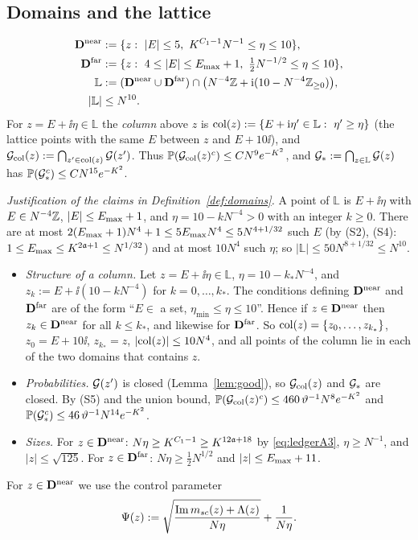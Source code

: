 \subsection{Domains and the lattice}
\begin{definition}\label{def:domains}
\begin{align*}
 \bD^{\rm near}&:=\{z:\ |E|\le5,\ K^{C_1-1}N^{-1}\le\eta\le10\},\\
 \bD^{\rm far}&:=\{z:\ 4\le|E|\le\Emax+1,\ \tfrac12N^{-1/2}\le\eta\le10\},\\
 \mathbb L&:=(\bD^{\rm near}\cup\bD^{\rm far})\cap\big(N^{-4}\Z+\ii(10-N^{-4}\Z_{\ge 0})\big),\\
 |\mathbb L|&\le N^{10}.
\end{align*}
For $z=E+\ii\eta\in\mathbb L$ the \emph{column} above $z$ is ${\rm col}(z):=\{E+\ii\eta'\in\mathbb L:\ \eta'\ge\eta\}$ (the lattice points with the same $E$ between $z$ and $E+10\ii$), and
$\mathcal{G}_{\rm col}(z):=\bigcap_{z'\in{\rm col}(z)}\mathcal{G}(z')$. Thus $\mathbb{P}(\mathcal{G}_{\rm col}(z)^c)\le CN^{9}e^{-K^2}$, and $\mathcal{G}_*:=\bigcap_{z\in\mathbb L}\mathcal{G}(z)$ has $\mathbb{P}(\mathcal{G}_*^c)\le CN^{15}e^{-K^2}$.
\end{definition}
\noindent\emph{Justification of the claims in Definition~\ref{def:domains}.} A point of $\mathbb L$ is $E+\ii\eta$ with $E\in N^{-4}\mathbb{Z}$, $|E|\le E_{\max}+1$, and $\eta=10-kN^{-4}>0$ with an integer $k\ge0$.
There are at most $2(E_{\max}+1)N^4+1\le5E_{\max} N^4\le5N^{4+1/32}$ such $E$ (by (S2), (S4): $1\le E_{\max}\le K^{2\mathfrak{a}+1}\le N^{1/32}$) and at most $10N^4$ such $\eta$; so $|\mathbb L|\le50N^{8+1/32}\le N^{10}$.
\begin{itemize}[leftmargin=2em,itemsep=1pt]
\item \emph{Structure of a column.} Let $z=E+\ii\eta\in\mathbb L$, $\eta=10-k_*N^{-4}$, and $z_k:=E+\ii(10-kN^{-4})$ for $k=0,\dots,k_*$. The conditions defining $\mathbf{D}^{\rm near}$ and $\mathbf{D}^{\rm far}$ are of the form ``$E\in$ a set, $\eta_{\min}\le\eta\le10$''.
Hence if $z\in\mathbf{D}^{\rm near}$ then $z_k\in\mathbf{D}^{\rm near}$ for all $k\le k_*$, and likewise for $\mathbf{D}^{\rm far}$. So ${\rm col}(z)=\{z_0,\dots,z_{k_*}\}$, $z_0=E+10\ii$, $z_{k_*}=z$, $|{\rm col}(z)|\le10N^4$, and all points of the column lie in each of the two domains that contains $z$.
\item \emph{Probabilities.} $\mathcal{G}(z')$ is closed (Lemma~\ref{lem:good}), so $\mathcal{G}_{\rm col}(z)$ and $\mathcal{G}_*$ are closed. By (S5) and the union bound, $\mathbb{P}(\mathcal{G}_{\rm col}(z)^c)\le460\,\vartheta^{-1}N^8e^{-K^2}$ and $\mathbb{P}(\mathcal{G}_*^c)\le46\,\vartheta^{-1}N^{14}e^{-K^2}$.
\item \emph{Sizes.} For $z\in\mathbf{D}^{\rm near}$: $N\eta\ge K^{C_1-1}\ge K^{12\mathfrak{a}+18}$ by \eqref{eq:ledgerA3}, $\eta\ge N^{-1}$, and $|z|\le\sqrt{125}$. For $z\in\mathbf{D}^{\rm far}$: $N\eta\ge\frac12N^{1/2}$ and $|z|\le E_{\max}+11$.
\end{itemize}
\noindent For $z\in\mathbf{D}^{\rm near}$ we use the control parameter
\begin{equation}\label{eq:Psi}
 \Psi(z):=\sqrt{\frac{\operatorname{Im}m_{sc}(z)+\Lambda(z)}{N\eta}}+\frac1{N\eta}.
\end{equation}
